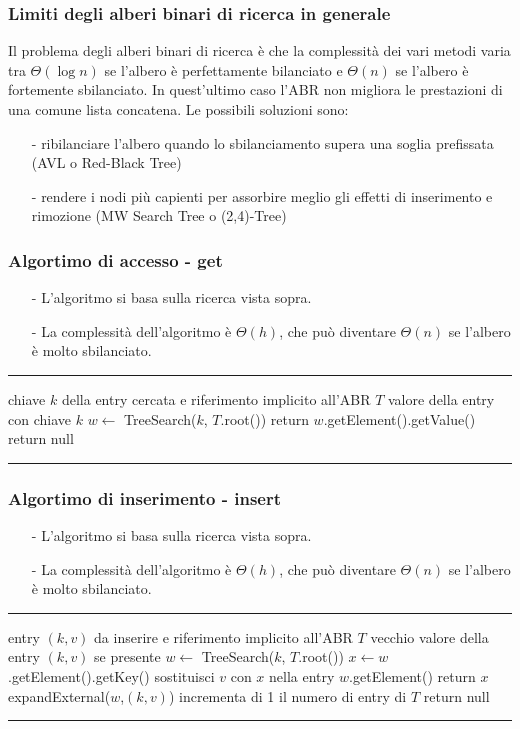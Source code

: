 \documentclass[a4paper]{article}
\makeatletter
\newenvironment{algo}[4]{
	\noindent\rule{\textwidth}{0.4pt}
	\begin{algorithmic}[1]
		\addtocounter{ALG@line}{-1}
		\Procedure{#1}{#2}
		\Require #3
		\Ensure #4
		\Statex }{
		\EndProcedure
	\end{algorithmic}
	\rule{\textwidth}{0.4pt}}
\makeatother
\begin{document}
\subsubsection*{Limiti degli alberi binari di ricerca in generale}
Il problema degli alberi binari di ricerca è che la complessità dei vari metodi varia tra \(\Theta(\log n)\) se l'albero è
perfettamente bilanciato e \(\Theta(n)\) se l'albero è fortemente sbilanciato. In quest'ultimo caso l'ABR non migliora le
prestazioni di una comune lista concatena. Le possibili soluzioni sono:
\begin{itemize}[topsep=3pt, itemsep=0pt]
	\item[-] ribilanciare l'albero quando lo sbilanciamento supera una soglia prefissata (AVL o Red-Black Tree)
	\item[-] rendere i nodi più capienti per assorbire meglio gli effetti di inserimento e rimozione (MW Search Tree o (2,4)-Tree)
\end{itemize}

\subsubsection*{Algortimo di accesso - get}
\begin{itemize}[topsep=3pt, itemsep=0pt]
	\item[-] L'algoritmo si basa sulla ricerca vista sopra.
	\item[-] La complessità dell'algoritmo è \(\Theta(h)\), che può diventare \(\Theta(n)\) se l'albero è molto sbilanciato.
\end{itemize}
\begin{algo}{get}{$k$}{chiave $k$ della entry cercata e riferimento implicito all'ABR $T$}{valore della entry con chiave $k$}
	\State $w \gets$ TreeSearch($k$, $T$.root())
		\State return $w$.getElement().getValue()
	\Else
		\State return null
	\EndIf
\end{algo}

\subsubsection*{Algortimo di inserimento - insert}
\begin{itemize}[topsep=3pt, itemsep=0pt]
	\item[-] L'algoritmo si basa sulla ricerca vista sopra.
	\item[-] La complessità dell'algoritmo è \(\Theta(h)\), che può diventare \(\Theta(n)\) se l'albero è molto sbilanciato.
\end{itemize}
\begin{algo}{put}{$k$, $v$}{entry $(k,v)$ da inserire e riferimento implicito all'ABR $T$}{vecchio valore della entry $(k,v)$ se presente}
	\State $w \gets$ TreeSearch($k$, $T$.root())
		\State $x \gets w$.getElement().getKey()
		\State sostituisci $v$ con $x$ nella entry $w$.getElement()
		\State return $x$
	\Else
		\State expandExternal($w$,$(k,v)$)
		\State incrementa di 1 il numero di entry di $T$
		\State return null
	\EndIf
\end{algo}
\end{document}
